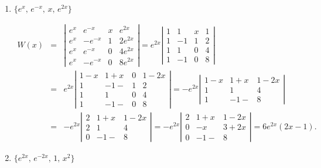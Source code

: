 \documentclass{ximera}
\begin{document}
\begin{problem}
\begin{enumerate}
\item $\{e^x,\,e^{-x},\,x,\,e^{2x}\}$

\begin{solution}
\begin{eqnarray*}
W(x)&=&\left|\begin{array}{crcc}
e^x&e^{-x}&x&e^{2x}\\
e^x&-e^{-x}&1&2e^{2x}\\
e^x&e^{-x}&0&4e^{2x}\\
e^x&-e^{-x}&0&8e^{2x}
\end{array}\right|
=e^{2x}\left|\begin{array}{crcc}
1&1&x&1\\
1&-1&1&2\\
1&1&0&4\\
1&-1&0&8
\end{array}\right|\\
&=&e^{2x}\left|\begin{array}{cccc}
1-x&1+x&0&1-2x\\
1&-1-&1&2\\
1&1&0&4\\
1&-1-&0&8
\end{array}\right|
=-e^{2x}\left|\begin{array}{ccc}
1-x&1+x&1-2x\\
1&1&4\\
1&-1-&8
\end{array}\right|\\
&=&-e^{2x}\left|\begin{array}{ccc}
2&1+x&1-2x\\
2&1&4\\
0&-1-&8
\end{array}\right|
=-e^{2x}\left|\begin{array}{ccc}
2&1+x&1-2x\\
0&-x&3+2x\\
0&-1-&8
\end{array}\right|=6e^{2x}(2x-1).
\end{eqnarray*}
\end{solution}

\item $\{e^{2x},\,e^{-2x},\,1,\,x^2\}$


\end{enumerate}
\end{problem}
\end{document}
